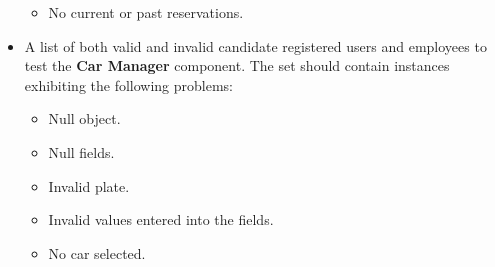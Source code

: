 \begin{itemize}
\begin{itemize}
		\item No current or past reservations.
	\end{itemize}
\item A list of both valid and invalid candidate registered users and employees to test the \textbf{Car Manager} component. The set should contain instances exhibiting the following problems: 
\begin{itemize}
	\item Null object.
	\item Null fields.
	\item Invalid plate.
	\item Invalid values entered into the fields.
	\item No car selected.
\end{itemize}
\end{itemize}